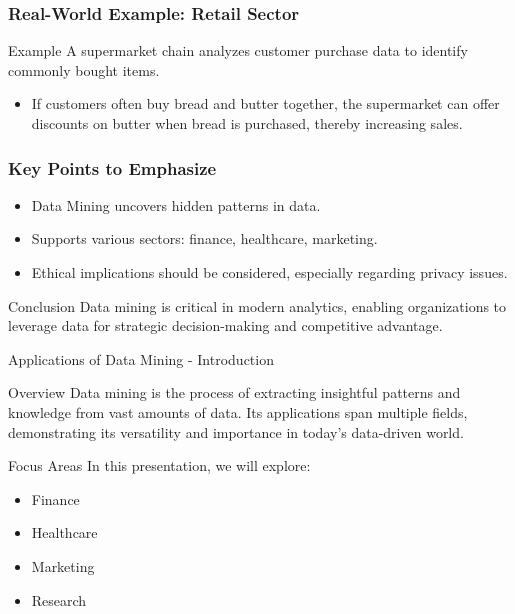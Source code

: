 \documentclass[aspectratio=169]{beamer}
\begin{document}
\begin{frame}[fragile]
    \frametitle{Real-World Example: Retail Sector}
    \begin{block}{Example}
        A supermarket chain analyzes customer purchase data to identify commonly bought items. 
        \begin{itemize}
            \item If customers often buy bread and butter together, the supermarket can offer discounts on butter when bread is purchased, thereby increasing sales.
        \end{itemize}
    \end{block}
\end{frame}

\begin{frame}[fragile]
    \frametitle{Key Points to Emphasize}
    \begin{itemize}
        \item Data Mining uncovers hidden patterns in data.
        \item Supports various sectors: finance, healthcare, marketing.
        \item Ethical implications should be considered, especially regarding privacy issues.
    \end{itemize}

    \begin{block}{Conclusion}
        Data mining is critical in modern analytics, enabling organizations to leverage data for strategic decision-making and competitive advantage.
    \end{block}
\end{frame}

\begin{frame}[fragile]{Applications of Data Mining - Introduction}
    \begin{block}{Overview}
        Data mining is the process of extracting insightful patterns and knowledge from vast amounts of data. Its applications span multiple fields, demonstrating its versatility and importance in today's data-driven world.
    \end{block}
    \begin{block}{Focus Areas}
        In this presentation, we will explore:
        \begin{itemize}
            \item Finance
            \item Healthcare
            \item Marketing
            \item Research
        \end{itemize}
    \end{block}
\end{frame}
\end{document}
